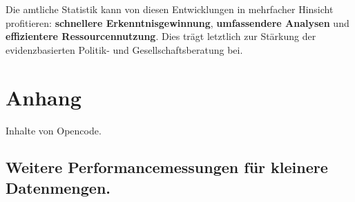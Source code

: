 \documentclass[
  german,
  10pt,
  twoside]{article}
\begin{document}
Die amtliche Statistik kann von diesen Entwicklungen in mehrfacher
Hinsicht profitieren: \textbf{schnellere Erkenntnisgewinnung},
\textbf{umfassendere Analysen} und \textbf{effizientere
Ressourcennutzung}. Dies trägt letztlich zur Stärkung der
evidenzbasierten Politik- und Gesellschaftsberatung bei.

\section*{Anhang}\label{anhang}

Inhalte von Opencode.

\subsection*{Weitere Performancemessungen für kleinere
Datenmengen.}\label{weitere-performancemessungen-fuxfcr-kleinere-datenmengen.}
\end{document}
